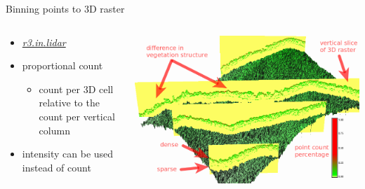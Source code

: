 \documentclass[xcolor={dvipsnames,usenames},beamer,aspectratio=43]{beamer}
\newcommand{\gmodule}[1]{\href{http://grass.osgeo.org/grass71/manuals/#1.html}{\emph{#1}}}
\begin{document}
\begin{frame}{Binning points to 3D raster}

\begin{columns}
\begin{column}{0.28\textwidth}

\begin{itemize}
  \item \gmodule{r3.in.lidar}
  \item proportional count
  \begin{itemize}
    \item count per 3D cell relative to the count per vertical column
  \end{itemize}
  \item intensity can be used instead of count
\end{itemize}

\end{column}
\begin{column}{0.7\textwidth}

\begin{center}
  \includegraphics[width=\textwidth]{grass/red_green_3d_labels}
\end{center}

\end{column}
\end{columns}

\end{frame}
\end{document}
